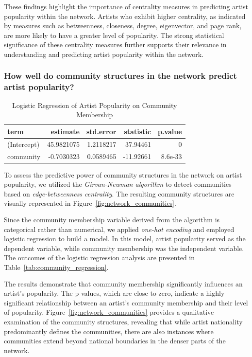 \documentclass{article}
\begin{document}
These findings highlight the importance of centrality measures in predicting
artist popularity within the network. Artists who exhibit higher centrality, as
indicated by measures such as betweenness, closeness, degree, eigenvector, and
page rank, are more likely to have a greater level of popularity. The strong
statistical significance of these centrality measures further supports their
relevance in understanding and predicting artist popularity within the network.

\subsubsection{How well do community structures in the network predict artist popularity?}

\begin{table}[H]
    \centering
    \begin{tabular}[t]{lrrrr}
        \toprule
        term        & estimate   & std.error & statistic & p.value \\
        \midrule
        (Intercept) & 45.9821075 & 1.2118217 & 37.94461  & 0       \\
        community   & -0.7030323 & 0.0589465 & -11.92661 & 8.6e-33 \\
        \bottomrule
    \end{tabular}
    \caption{Logistic Regression of Artist Popularity on Community Membership}
\end{table}\label{tab:community_regression}

To assess the predictive power of community structures in the network on artist
popularity, we utilized the \textit{Girvan-Newman algorithm} to detect
communities based on \textit{edge-betweenness centrality}. The resulting
community structures are visually represented in Figure\
\ref{fig:network_communities}.

Since the community membership variable derived from the algorithm is
categorical rather than numerical, we applied \textit{one-hot encoding} and
employed logistic regression to build a model. In this model, artist popularity
served as the dependent variable, while community membership was the
independent variable. The outcomes of the logistic regression analysis are
presented in Table\ \ref{tab:community_regression}.

The results demonstrate that community membership significantly influences an
artist's popularity. The p-values, which are close to zero, indicate a highly
significant relationship between an artist's community membership and their
level of popularity. Figure\ \ref{fig:network_communities} provides a
qualitative examination of the community structures, revealing that while
artist nationality predominantly defines the communities, there are also
instances where communities extend beyond national boundaries in the denser
parts of the network.
\end{document}
